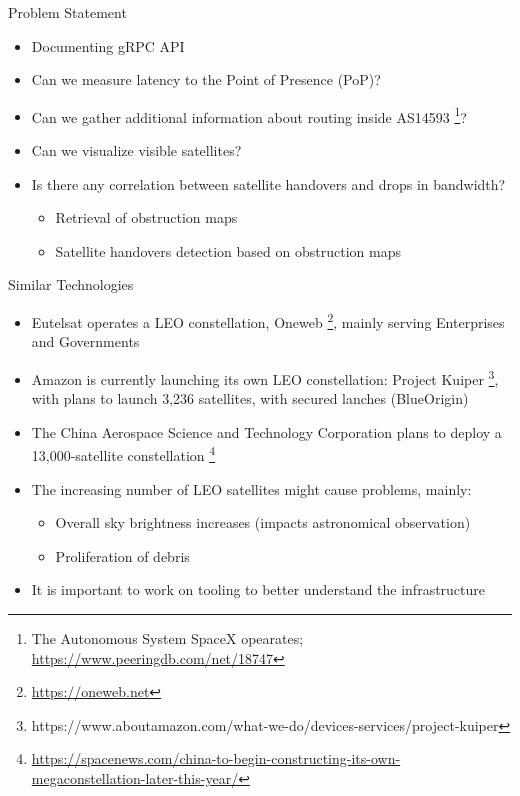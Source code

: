 \documentclass[NET,english,beameralt]{tumbeamer}
\begin{document}
\begin{frame}{Problem Statement}
    \begin{itemize}
        \item Documenting gRPC API
        \item Can we measure latency to the Point of Presence (PoP)?
        \item Can we gather additional information about routing inside AS14593 
              \footnote{The Autonomous System SpaceX opearates; \url{https://www.peeringdb.com/net/18747}}?
        \item Can we visualize visible satellites?
        \item Is there any correlation between satellite handovers and drops in bandwidth?
            \begin{itemize}
                \item Retrieval of obstruction maps
                \item Satellite handovers detection based on obstruction maps
            \end{itemize}
    \end{itemize}
\end{frame}

\begin{frame}{Similar Technologies}
    \begin{itemize}
        \item Eutelsat operates a LEO constellation, Oneweb \footnote{\url{https://oneweb.net}}, mainly serving
              Enterprises and Governments
        \item Amazon is currently launching its own LEO constellation: Project Kuiper
              \footnote{https://www.aboutamazon.com/what-we-do/devices-services/project-kuiper}, with plans to launch
              3,236 satellites, with secured lanches (BlueOrigin)
        \item The China Aerospace Science and Technology Corporation plans to deploy a 13,000-satellite constellation
              \footnote{\url{https://spacenews.com/china-to-begin-constructing-its-own-megaconstellation-later-this-year/}}
        \item The increasing number of LEO satellites might cause problems, mainly:
        \begin{itemize}
            \item Overall sky brightness increases (impacts astronomical observation)
            \item Proliferation of debris
        \end{itemize}
        \item It is important to work on tooling to better understand the infrastructure
    \end{itemize}
\end{frame}
\end{document}

